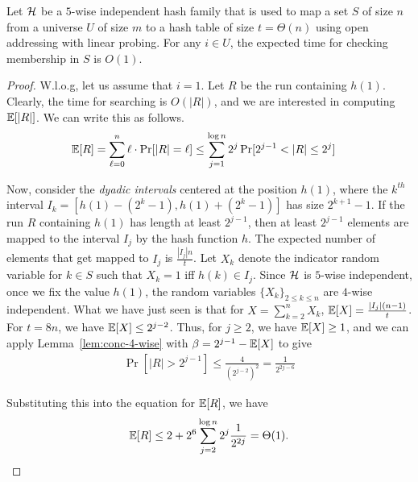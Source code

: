 \begin{lemma}
  Let ${\cal H}$ be a $5$-wise independent hash family that is used to map a set
  $S$ of size $n$ from a universe $U$ of size $m$ to a hash table of size
  $t = \Theta(n)$ using open addressing with linear probing. For any $i\in U$,
  the expected time for checking membership in $S$ is $O(1)$.
  \label{lem:linear-probe-run}
\end{lemma}
\begin{proof}
W.l.o.g, let us assume that $i=1$. Let $R$ be the run containing
$h(1)$. Clearly, the time for searching is $O(|R|)$, and we are
interested in computing $\mathbb{E}[|R|]$. We can write this as follows.
\begin{align*}
  \mathbb{E}[R] &= \sum_{\ell = 0}^n \ell \cdot \Pr[|R| = \ell] \leq \sum_{j=1}^{\log n} 2^{j} \Pr[ 2^{j-1} < |R| \leq 2^j]
\end{align*}

Now, consider the \emph{dyadic intervals} centered at the position $h(1)$, where
the $k^{th}$ interval $I_k = [h(1) - (2^k - 1), h(1) + (2^k - 1)]$ has size
$2^{k+1}-1$. If the run $R$ containing $h(1)$ has length at least $2^{j-1}$,
then at least $2^{j-1}$ elements are mapped to the interval $I_j$ by the hash
function $h$. The expected number of elements that get mapped to $I_j$ is
$\frac{|I_j|n}{t}$. Let $X_k$ denote the indicator random variable for $k\in S$
such that $X_k=1$ iff $h(k) \in I_j$. Since ${\cal H}$ is $5$-wise independent,
once we fix the value $h(1)$, the random variables $\{X_k\}_{2\leq k\leq n}$ are
$4$-wise independent. What we have just seen is that for $X = \sum_{k=2}^n X_k$,
$\mathbb{E}[X] = \frac{|I_j|(n-1)}{t}$. For $t = 8n$, we have $\mathbb{E}[X] \leq 2^{j-2}$. Thus,
for $j \geq 2$, we have $\mathbb{E}[X] \geq 1$, and we can apply
Lemma~\ref{lem:conc-4-wise} with $\beta = 2^{j-1}-\mathbb{E}[X]$ to give
\begin{align*}
  \Pr[|R| > 2^{j-1}] \leq \frac{4}{\left(2^{j-2} \right)^2} = \frac{1}{2^{2j-6}}
\end{align*}

Substituting  this into the equation for $\mathbb{E}[R]$, we have
\begin{align*}
  \mathbb{E}[R] \leq 2 + 2^6 \sum_{j=2}^{\log n} 2^j \frac{1}{2^{2j}} = \Theta(1).
\end{align*}  
\end{proof}

